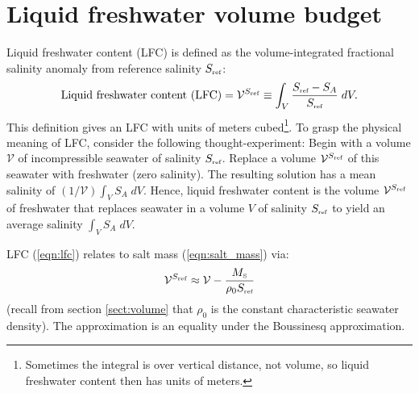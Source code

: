 \documentclass[10pt]{amsart}
\newcommand{\Sref}{S_{\mbox{\tiny ref}}}
\newcommand{\MS}{M_{\mbox{\tiny S}}}
\newcommand{\V}{{\mathcal V}}
\newcommand{\LFC}{\V^{\Sref}}
\begin{document}
\section{Liquid freshwater volume budget}
\label{sect:LFC}

Liquid freshwater content (LFC) is defined as the volume-integrated fractional salinity anomaly from reference salinity $\Sref$:
\begin{align}
{\rm Liquid~freshwater~content~(LFC)}  = \LFC \equiv \int_V \frac{\Sref - S_A}{\Sref} \; dV .
\label{eqn:lfc}
\end{align}
This definition gives an LFC with units of meters cubed\footnote{Sometimes the integral is over vertical distance, not volume, so liquid freshwater content then has units of meters.}.
To grasp the physical meaning of LFC, consider the following thought-experiment: Begin with a volume $\V $ of incompressible seawater of salinity $\Sref$. 
Replace a volume $\LFC$ of this seawater with freshwater (zero salinity). 
The resulting solution has a mean salinity of $(1 / \V ) \int_V S_A \; dV$.
Hence, liquid freshwater content is the volume $\LFC$ of freshwater that replaces seawater in a volume $V$ of salinity $\Sref$ to yield an average salinity $\int_V S_A \; dV$.


LFC (\ref{eqn:lfc}) relates to salt mass (\ref{eqn:salt_mass}) via:
\begin{align}
\LFC  \approx \V  - \frac{\MS}{\rho_0 \Sref}
\label{eqn:lfc_salt_mass_relation}
\end{align}
(recall from section \ref{sect:volume} that $\rho_0$ is the constant characteristic seawater density).
The approximation is an equality under the Boussinesq approximation.
\end{document}

